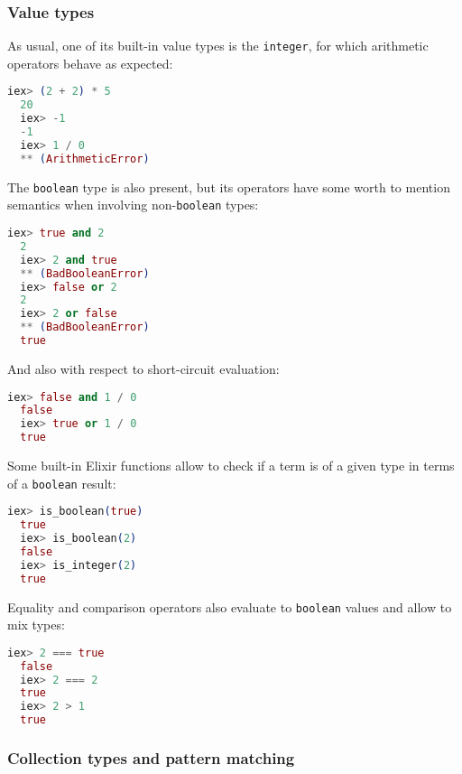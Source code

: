 \subsubsection{Value types}

As usual, one of its built-in value types is the \verb|integer|, for which
arithmetic operators behave as expected:

\begin{lstlisting}[language=elixir,numbers=none,frame=none]
  iex> (2 + 2) * 5
  20
  iex> -1
  -1
  iex> 1 / 0
  ** (ArithmeticError)
\end{lstlisting}

The \verb|boolean| type is also present, but its operators have some
worth to mention semantics when involving non-\verb|boolean| types:

\begin{lstlisting}[language=elixir,numbers=none,frame=none]
  iex> true and 2
  2
  iex> 2 and true
  ** (BadBooleanError)
  iex> false or 2
  2
  iex> 2 or false
  ** (BadBooleanError)
  true
\end{lstlisting}

And also with respect to short-circuit evaluation:

\begin{lstlisting}[language=elixir,numbers=none,frame=none]
  iex> false and 1 / 0
  false
  iex> true or 1 / 0
  true
\end{lstlisting}

Some built-in Elixir functions allow to check if a term is of a given type in 
terms of a \verb|boolean| result:

\begin{lstlisting}[language=elixir,numbers=none,frame=none]
  iex> is_boolean(true)
  true
  iex> is_boolean(2)
  false
  iex> is_integer(2)
  true
\end{lstlisting}

Equality and comparison operators also evaluate to \verb|boolean| values and
allow to mix types:

\begin{lstlisting}[language=elixir,numbers=none,frame=none]
  iex> 2 === true
  false
  iex> 2 === 2
  true
  iex> 2 > 1
  true
\end{lstlisting}

\subsubsection{Collection types and pattern matching}

